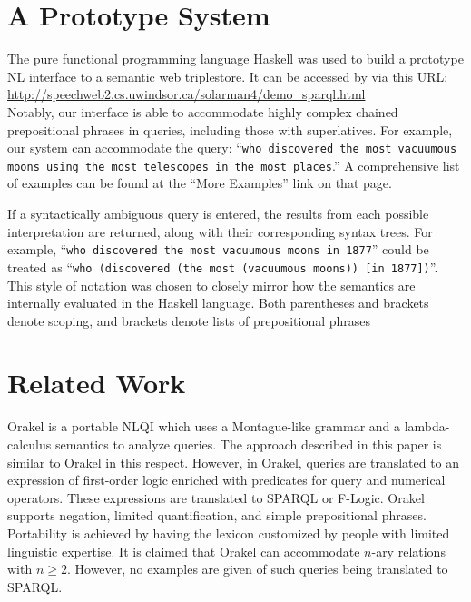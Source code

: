 \documentclass[../main.tex]{subfiles}
\begin{document}
\begin{refsection}
\section{A Prototype System}
\label{icsc2020conf:prot}

The pure functional programming language Haskell was used to build a prototype NL interface to a
semantic web triplestore.  It can be accessed by via this URL: \\

{\small \url{http://speechweb2.cs.uwindsor.ca/solarman4/demo_sparql.html}} \\

\noindent Notably, our interface is able to accommodate highly complex chained prepositional phrases in queries, including those with superlatives.
For example, our system can accommodate the query: ``\texttt{who discovered the most vacuumous moons using the most telescopes in the most places}.''  A comprehensive list of examples can be found at the ``More Examples'' link on that page.

If a syntactically ambiguous query is entered, the results from each possible interpretation are returned, along with their corresponding syntax trees.
For example, ``\texttt{who discovered the most vacuumous moons in 1877}'' could be treated as ``\texttt{who (discovered (the most (vacuumous moons)) [in 1877])}''.  This style of notation was chosen to closely mirror how the semantics are internally evaluated in the Haskell language.  Both parentheses and brackets denote scoping, and brackets denote lists of prepositional phrases

\section{Related Work}
\label{icsc2020conf:relatedwork}
Orakel \cite{cimiano:haase} is a portable NLQI which uses a Montague-like grammar and a lambda-calculus semantics to analyze queries. The approach described in this paper is similar to Orakel in this respect. However, in Orakel, queries are translated to an expression of first-order logic enriched with predicates for query and numerical operators. These expressions are translated to SPARQL or F-Logic. Orakel supports negation, limited quantification, and simple prepositional phrases. Portability is achieved by having the lexicon customized by people with limited linguistic expertise. It is claimed that Orakel can accommodate $n$-ary relations with $n \geq 2$. However, no examples are given of such queries being translated to SPARQL.


\end{refsection}
\end{document}
